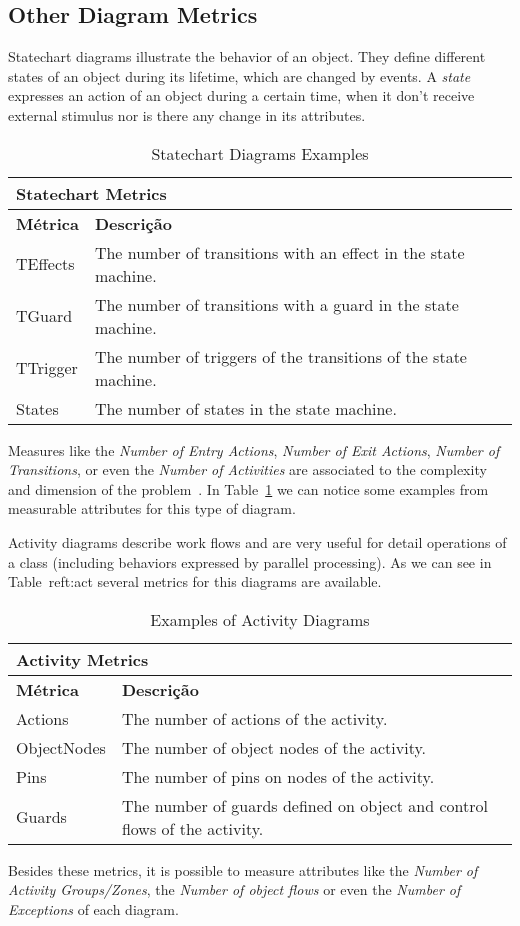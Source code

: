 \subsection{Other Diagram Metrics}

Statechart diagrams illustrate the behavior of an object.
They define different states of an object during its lifetime, which are changed by events.
A \emph{state} expresses an action of an object during a certain time, when it don't receive external stimulus nor is there any change in its attributes. 

\begin{table}[h]\centering
\begin{tabular}{ p{2cm} | p{}}
\multicolumn{2}{l}{\textbf{Statechart Metrics}} \\ \hline
\textbf{Métrica}  & \textbf{Descrição} \\ \hline
TEffects  & The number of transitions with an effect in the state machine. \\ \hline 
TGuard & The number of transitions with a guard in the state machine. \\ \hline 
TTrigger & The number of triggers of the transitions of the state machine. \\ \hline 
States & The number of states in the state machine. \\ \hline 
\end{tabular}
\caption{\small{Statechart Diagrams Examples}}
\label{t:estado}
\end{table}

Measures like the \emph{Number of Entry Actions}, \emph{Number of Exit Actions}, \emph{Number of Transitions}, or even the \emph{Number of Activities} are associated to the complexity and dimension of the problem~\cite{EVMmdm}.
In Table~\ref{t:estado} we can notice some examples from measurable attributes for this type of diagram.

Activity diagrams describe work flows and are very useful for detail operations of a class (including behaviors expressed by parallel processing).
As we can see in Table~ref{t:act} several metrics for this diagrams are available.

\begin{table}[h]\centering
\begin{tabular}{ p{2cm}|   p{}}
\multicolumn{2}{l}{\textbf{Activity Metrics}} \\ \hline
\textbf{Métrica} & \textbf{Descrição} \\ \hline
Actions  & The number of actions of the activity. \\ \hline 
ObjectNodes & The number of object nodes of the activity. \\ \hline 
Pins  & The number of pins on nodes of the activity. \\ \hline 
Guards  & The number of guards defined on object and control flows of the activity. \\ \hline 
\end{tabular}
\caption{\small{Examples of Activity Diagrams}}
\label{t:act}
\end{table}

Besides these metrics, it is possible to measure attributes like the \emph{Number of Activity Groups/Zones}, the \emph{Number of object flows} or even the \emph{Number of Exceptions} of each diagram. 